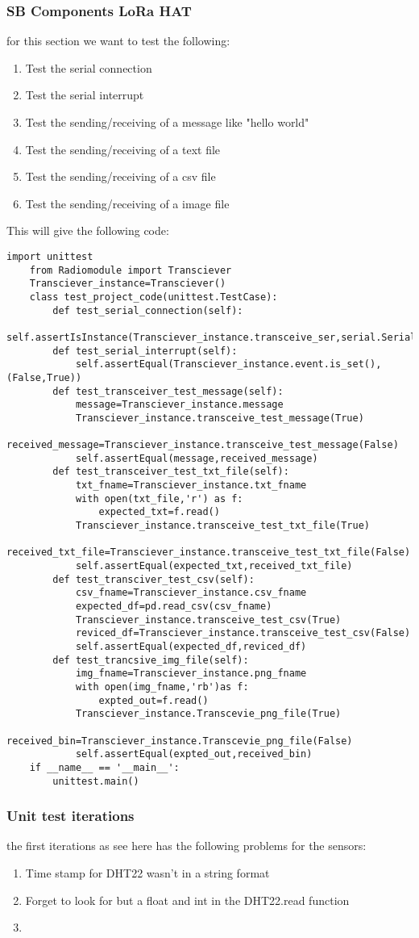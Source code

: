 \subsubsection{SB Components LoRa HAT}
for this section we want to test the following:
\begin{enumerate}
    \item Test the serial connection
    \item Test the serial interrupt
    \item Test the sending/receiving of a message like "hello world"
    \item Test the sending/receiving of a text file 
    \item Test the sending/receiving of a csv file
    \item Test the sending/receiving of a image file
\end{enumerate}
This will give  the following code:
\begin{lstlisting}[style=mystyle]
    import unittest
    from Radiomodule import Transciever
    Transciever_instance=Transciever()
    class test_project_code(unittest.TestCase):
        def test_serial_connection(self):
            self.assertIsInstance(Transciever_instance.transceive_ser,serial.Serial)
        def test_serial_interrupt(self):
            self.assertEqual(Transciever_instance.event.is_set(),(False,True))
        def test_transceiver_test_message(self):
            message=Transciever_instance.message
            Transciever_instance.transceive_test_message(True)
            received_message=Transciever_instance.transceive_test_message(False)
            self.assertEqual(message,received_message)
        def test_transceiver_test_txt_file(self):
            txt_fname=Transciever_instance.txt_fname
            with open(txt_file,'r') as f:
                expected_txt=f.read()
            Transciever_instance.transceive_test_txt_file(True)
            received_txt_file=Transciever_instance.transceive_test_txt_file(False)
            self.assertEqual(expected_txt,received_txt_file)
        def test_transciver_test_csv(self):
            csv_fname=Transciever_instance.csv_fname
            expected_df=pd.read_csv(csv_fname)
            Transciever_instance.transceive_test_csv(True)
            reviced_df=Transciever_instance.transceive_test_csv(False)
            self.assertEqual(expected_df,reviced_df)
        def test_trancsive_img_file(self):
            img_fname=Transciever_instance.png_fname
            with open(img_fname,'rb')as f:
                expted_out=f.read()
            Transciever_instance.Transcevie_png_file(True)
            received_bin=Transciever_instance.Transcevie_png_file(False)
            self.assertEqual(expted_out,received_bin)
    if __name__ == '__main__':
        unittest.main()
\end{lstlisting}
\subsubsection{Unit test iterations}
the first iterations as see here has the following problems for the sensors:
\begin{enumerate}
    \item Time stamp for DHT22 wasn't in a string format 
    \item Forget to look for but a float and int  in the DHT22.read function
    \item 
\end{enumerate}
